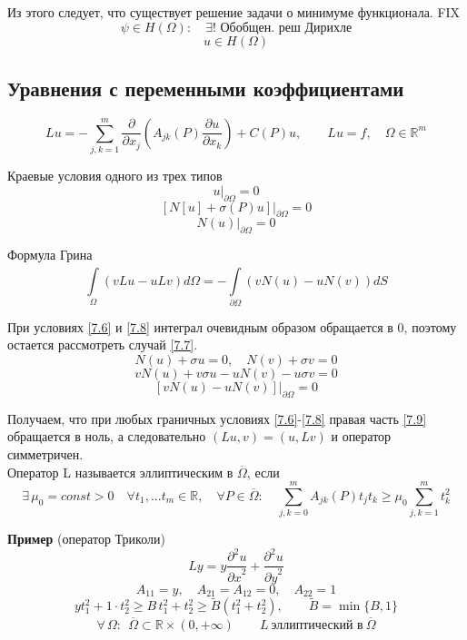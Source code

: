\documentclass[12pt, a4paper]{article}
\newcommand{\Int}{\int\limits}
\newcommand{\Sum}{\sum\limits}
\begin{document}
Из этого следует, что существует решение задачи о минимуме функционала.
FIX
\[ \psi \in H(\Omega): \quad \exists ! \textrm{ Обобщен. реш Дирихле} \]
\[ u \in H (\Omega) \]

\subsection{Уравнения с переменными коэффициентами}

\[ Lu = - \Sum_{j,k=1}^{m} \frac{\partial }{\partial x_j} \left(A_{jk}(P) \frac{\partial u}{\partial x_k}\right) + C(P) u, \qquad Lu=f, \quad \Omega \in \mathbb{R}^m \label{7.5} \tag{7.5} \]

Краевые условия одного из трех типов
\[ u|_{\partial \Omega} = 0 \label{7.6} \tag{7.6} \]
\[ {\left. \left[N [u] + \sigma (P) u \right] \right|}_{\partial \Omega} = 0 \label{7.7} \tag{7.7} \]
\[ {\left. N(u) \right|}_{\partial \Omega} = 0 \label{7.8} \tag{7.8} \]

Формула Грина
\[ \Int_{\Omega}^{} \left(v Lu - uLv\right) d\Omega = - \Int_{\partial \Omega}^{} \left(v N(u) - u N(v)\right) dS \label{7.9} \tag{7.9} \]

При условиях \eqref{7.6} и \eqref{7.8} интеграл очевидным образом обращается в 0, поэтому остается рассмотреть случай \eqref{7.7}.
\[ N(u) + \sigma u = 0, \quad N(v) + \sigma v = 0 \]
\[ v N(u) + v \sigma u - u N(v) - u \sigma v = 0 \]
\[ {\left. \left[ v N(u) - u N(v) \right] \right|}_{\partial \Omega} = 0 \]

Получаем, что при любых граничных условиях \eqref{7.6}-\eqref{7.8} правая часть \eqref{7.9} обращается в ноль, а следовательно $(Lu, v) = (u, Lv)$ и оператор симметричен. \\

Оператор L называется эллиптическим в $ \overline{\Omega} $, если
\[ \exists \, \mu_0 = const > 0 \quad \forall t_1, ... t_m \in \mathbb{R}, \quad \forall P \in \overline{\Omega}: \quad \Sum_{j,k=0}^{m} A_{jk}(P) t_j t_k \geq \mu_0 \Sum_{j,k=1}^{m} t_k^2 \]

\textbf{Пример} (оператор Триколи)
\[ Ly = y \frac{\partial^2 u}{{\partial x}^2} + \frac{\partial^2 u}{{\partial y}^2} \]
\[ A_{11} = y, \quad A_{21} = A_{12} = 0, \quad A_{22} = 1 \]
\[ y t_1^2 + 1\cdot t^2_2 \geq B \, t^2_1 + t^2_2 \geq \widetilde{B}(t^2_1+t^2_2), \qquad \widetilde{B} = \min \{B, 1\} \]
\[ \forall \, \Omega : \ \ \overline{\Omega} \subset \mathbb{R} \times (0, +\infty) \qquad L \ \text{эллиптический в} \ \overline{\Omega} \] \\
\end{document}
